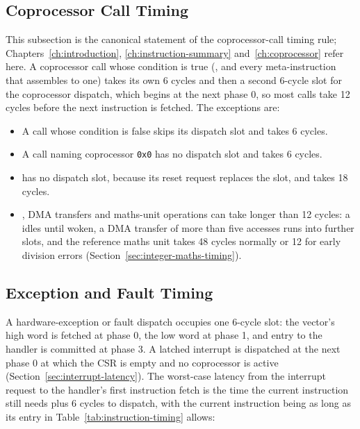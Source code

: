 \subsection{Coprocessor Call Timing}
\label{sec:coprocessor-call-timing}

This subsection is the canonical statement of the coprocessor-call timing rule; Chapters~\ref{ch:introduction},
\ref{ch:instruction-summary} and~\ref{ch:coprocessor} refer here. A coprocessor call whose condition is true
(,  and every meta-instruction that assembles to one) takes its own 6 cycles and then a
second 6-cycle slot for the coprocessor dispatch, which begins at the next phase 0, so most calls take 12 cycles before
the next instruction is fetched. The exceptions are:

\begin{itemize}
	\item A call whose condition is false skips its dispatch slot and takes 6 cycles.
	\item A call naming coprocessor \texttt{0x0} has no dispatch slot and takes 6 cycles.
	\item {} has no dispatch slot, because its reset request replaces the slot, and takes 18 cycles.
	\item {}, DMA transfers and maths-unit operations can take longer than 12 cycles: a  idles
	      until woken, a DMA transfer of more than five accesses runs into further slots, and the reference maths unit
	      takes 48 cycles normally or 12 for early division errors (Section~\ref{sec:integer-maths-timing}).
\end{itemize}

\subsection{Exception and Fault Timing}
\label{sec:exception-and-fault-timing}

A hardware-exception or fault dispatch occupies one 6-cycle slot: the vector's high word is fetched at phase 0, the low
word at phase 1, and entry to the handler is committed at phase 3. A latched interrupt is dispatched at the next phase
0 at which the CSR is empty and no coprocessor is active (Section~\ref{sec:interrupt-latency}). The worst-case latency
from the interrupt request to the handler's first instruction fetch is the time the current instruction still needs
plus 6 cycles to dispatch, with the current instruction being as long as its entry in
Table~\ref{tab:instruction-timing} allows:

